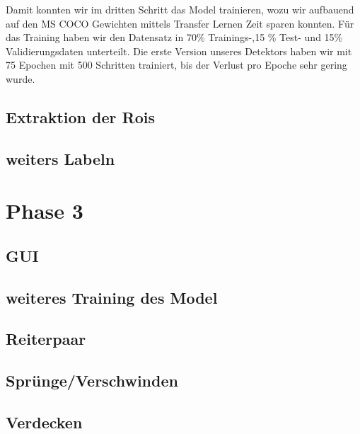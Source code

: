 Damit konnten wir im dritten Schritt das Model trainieren, wozu wir aufbauend auf den MS COCO Gewichten mittels Transfer Lernen Zeit sparen konnten. Für das Training haben wir den Datensatz in 70\% Trainings-,15 \% Test- und 15\% Validierungsdaten unterteilt. Die erste Version unseres Detektors haben wir mit 75 Epochen mit 500 Schritten trainiert, bis der Verlust pro Epoche sehr gering wurde.

\subsection{Extraktion der Rois}
\subsection{weiters Labeln}


\section{Phase 3}

\subsection{GUI}
\subsection{weiteres Training des Model}
\subsection{Reiterpaar}
\subsection{Sprünge/Verschwinden}
\subsection{Verdecken}
